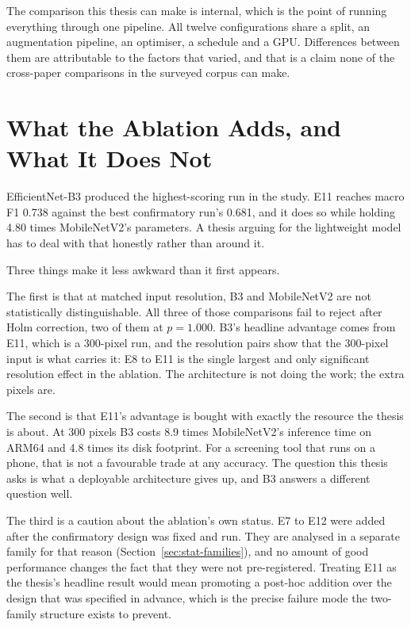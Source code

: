 The comparison this thesis can make is internal, which is the point of running everything
through one pipeline. All twelve configurations share a split, an augmentation pipeline,
an optimiser, a schedule and a GPU. Differences between them are attributable to the
factors that varied, and that is a claim none of the cross-paper comparisons in the
surveyed corpus can make.

\section{What the Ablation Adds, and What It Does Not}
\label{sec:disc-ablation}

EfficientNet-B3 produced the highest-scoring run in the study. E11 reaches macro F1 0.738
against the best confirmatory run's 0.681, and it does so while holding 4.80 times
MobileNetV2's parameters. A thesis arguing for the lightweight model has to deal with
that honestly rather than around it.

Three things make it less awkward than it first appears.

The first is that at matched input resolution, B3 and MobileNetV2 are not statistically
distinguishable. All three of those comparisons fail to reject after Holm correction, two
of them at $p = 1.000$. B3's headline advantage comes from E11, which is a 300-pixel run,
and the resolution pairs show that the 300-pixel input is what carries it: E8 to E11 is
the single largest and only significant resolution effect in the ablation. The
architecture is not doing the work; the extra pixels are.

The second is that E11's advantage is bought with exactly the resource the thesis is
about. At 300 pixels B3 costs 8.9 times MobileNetV2's inference time on ARM64 and 4.8
times its disk footprint. For a screening tool that runs on a phone, that is not a
favourable trade at any accuracy. The question this thesis asks is what a deployable
architecture gives up, and B3 answers a different question well.

The third is a caution about the ablation's own status. E7 to E12 were added after the
confirmatory design was fixed and run. They are analysed in a separate family for that
reason (Section~\ref{sec:stat-families}), and no amount of good performance changes the
fact that they were not pre-registered. Treating E11 as the thesis's headline result
would mean promoting a post-hoc addition over the design that was specified in advance,
which is the precise failure mode the two-family structure exists to prevent.

